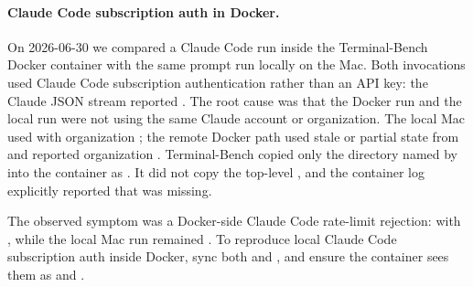 \documentclass[11pt]{article}
\begin{document}
\paragraph{Claude Code subscription auth in Docker.}
On 2026-06-30 we compared a Claude Code run inside the Terminal-Bench Docker container with the same prompt run locally on the Mac.
Both invocations used Claude Code subscription authentication rather than an API key: the Claude JSON stream reported . 
The root cause was that the Docker run and the local run were not using the same Claude account or organization. 
The local Mac used  with organization ; the remote Docker path used stale or partial state from  and reported organization . 
Terminal-Bench copied only the directory named by  into the container as . 
It did not copy the top-level , and the container log explicitly reported that  was missing.

The observed symptom was a Docker-side Claude Code rate-limit rejection:  with , while the local Mac run remained . 
To reproduce local Claude Code subscription auth inside Docker, sync both  and , and ensure the container sees them as  and .
\end{document}
